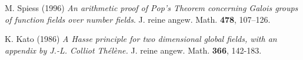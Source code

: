 \begin{thebibliography}{99999}

	M. Spiess (1996)
	\textit{An arithmetic proof of Pop's Theorem concerning Galois groups of function fields over number fields}.
    J. reine angew. Math. \textbf{478}, 107\---126.
   
    K. Kato (1986)
    \textit{A Hasse principle for two dimensional global fields, with an appendix by J.-L. Colliot Thélène.} J. reine angew. Math. \textbf{366}, 142-183.

\end{thebibliography}
